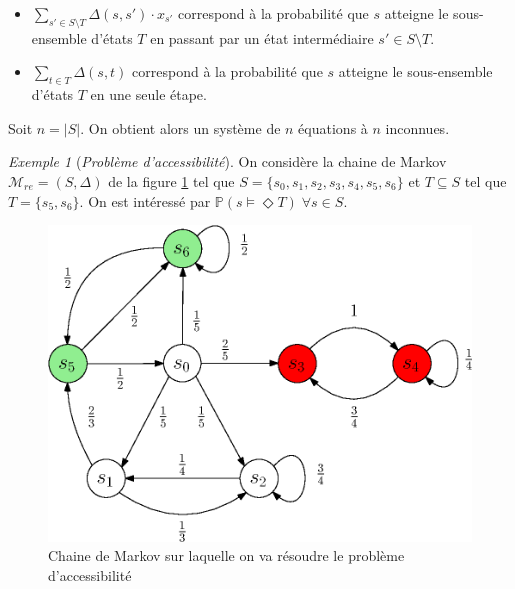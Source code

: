 \documentclass[12pt,a4paper]{report}
\theoremstyle{definition}
\theoremstyle{remark}
\newtheorem{example}{Exemple}[chapter]
\let\labelitemi\labelitemii
\begin{document}
\begin{itemize}
\renewcommand{\labelitemi}{\tiny$\bullet$}
	\item $ \sum_{s' \in S \setminus T}  \Delta(s, s') \cdot x_{s'} $ correspond à la probabilité que $s$ atteigne le sous-ensemble d'états $T$ en passant par un état intermédiaire $s' \in S \setminus T$.
	\item $\sum_{t \in T} \Delta(s, t)$ correspond à la probabilité que $s$ atteigne le sous-ensemble d'états $T$ en une seule étape.
\end{itemize}
Soit $n = |S|$. On obtient alors un système de $n$ équations à $n$ inconnues.

\begin{example}[\textit{Problème d'accessibilité}]\label{reachex}
	On considère la chaine de Markov $\mathcal{M}_{re} = (S, \Delta)$ de la figure \ref{reachability-example} tel que $S = \{s_0, s_1, s_2, s_3, s_4, s_5, s_6\}$ et $T \subseteq S$ tel que $T = \{ s_5, s_6 \}$. On est intéressé par $\mathbb{P}(s \models \Diamond T) \; \forall s \in S$.
	\begin{figure}[H]
	\centering
	\includegraphics[scale=0.7]{figures/reachability-example.eps}
	\caption{Chaine de Markov sur laquelle on va résoudre le problème d'accessibilité}
	\label{reachability-example}
	\end{figure}


\end{example}
\end{document}
